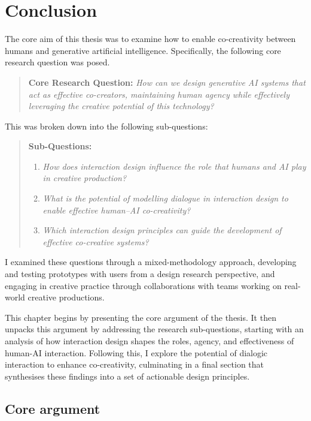 \chapter{Conclusion}\label{c:conclusion}

The core aim of this thesis was to examine how to enable co-creativity between humans and generative artificial intelligence. Specifically, the following core research question was posed.

\begin{quote}
\textbf{Core Research Question:}
\emph{How can we design generative AI systems that act as effective co-creators, maintaining human agency while effectively leveraging the creative potential of this technology?}
\end{quote}

This was broken down into the following sub-questions:

\begin{quote}
\textbf{Sub-Questions:}
\begin{enumerate}
    \item \emph{How does interaction design influence the role that humans and AI play in creative production?}
    \item \emph{What is the potential of modelling dialogue in interaction design to enable effective human–AI co-creativity?}
    \item \emph{Which interaction design principles can guide the development of effective co-creative systems?}
\end{enumerate}
\end{quote}

I examined these questions through a mixed-methodology approach, developing and testing prototypes with users from a design research perspective, and engaging in creative practice through collaborations with teams working on real-world creative productions.

This chapter begins by presenting the core argument of the thesis. It then unpacks this argument by addressing the research sub-questions, starting with an analysis of how interaction design shapes the roles, agency, and effectiveness of human-AI interaction. Following this, I explore the potential of dialogic interaction to enhance co-creativity, culminating in a final section that synthesises these findings into a set of actionable design principles.

\section{Core argument}


